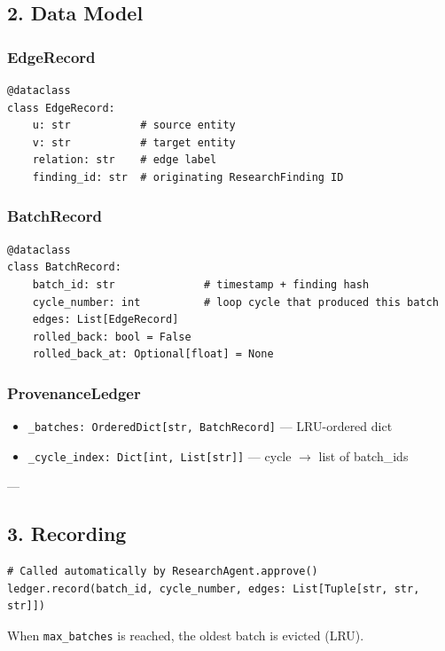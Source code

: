 \subsection{2. Data Model}

\subsubsection{EdgeRecord}
\begin{lstlisting}
@dataclass
class EdgeRecord:
    u: str           # source entity
    v: str           # target entity
    relation: str    # edge label
    finding_id: str  # originating ResearchFinding ID
\end{lstlisting}

\subsubsection{BatchRecord}
\begin{lstlisting}
@dataclass
class BatchRecord:
    batch_id: str              # timestamp + finding hash
    cycle_number: int          # loop cycle that produced this batch
    edges: List[EdgeRecord]
    rolled_back: bool = False
    rolled_back_at: Optional[float] = None
\end{lstlisting}

\subsubsection{ProvenanceLedger}
\begin{itemize}
\item \texttt{\_batches: OrderedDict[str, BatchRecord]} — LRU-ordered dict
\item \texttt{\_cycle\_index: Dict[int, List[str]]} — cycle $\to$ list of batch\_ids

\end{itemize}
---

\subsection{3. Recording}

\begin{lstlisting}
# Called automatically by ResearchAgent.approve()
ledger.record(batch_id, cycle_number, edges: List[Tuple[str, str, str]])
\end{lstlisting}

When \texttt{max\_batches} is reached, the oldest batch is evicted (LRU).

